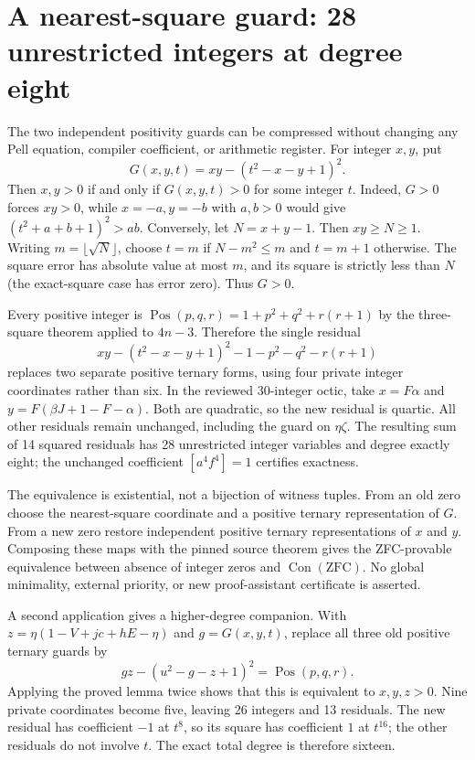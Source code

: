 \section{A nearest-square guard: 28 unrestricted integers at degree eight}
The two independent positivity guards can be compressed without changing any
Pell equation, compiler coefficient, or arithmetic register.
For integer $x,y$, put
\[
 G(x,y,t)=xy-(t^2-x-y+1)^2.
\]
Then $x,y>0$ if and only if $G(x,y,t)>0$ for some integer $t$.
Indeed, $G>0$ forces $xy>0$, while $x=-a,y=-b$ with $a,b>0$
would give $(t^2+a+b+1)^2>ab$. Conversely, let $N=x+y-1$.
Then $xy\geq N\geq1$. Writing $m=\lfloor\sqrt N\rfloor$, choose
$t=m$ if $N-m^2\leq m$ and $t=m+1$ otherwise. The square error
has absolute value at most $m$, and its square is strictly less than $N$
(the exact-square case has error zero). Thus $G>0$.

Every positive integer is
$\operatorname{Pos}(p,q,r)=1+p^2+q^2+r(r+1)$ by the three-square theorem
applied to $4n-3$. Therefore the single residual
\[
 xy-(t^2-x-y+1)^2-1-p^2-q^2-r(r+1)
\]
replaces two separate positive ternary forms, using four private integer
coordinates rather than six. In the reviewed 30-integer octic, take
$x=F\alpha$ and $y=F(\beta J+1-F-\alpha)$.
Both are quadratic, so the new residual is quartic. All other residuals
remain unchanged, including the guard on $\eta\zeta$.
The resulting sum of 14 squared residuals has 28 unrestricted integer
variables and degree exactly eight; the unchanged coefficient
$[a^4f^4]=1$ certifies exactness.

The equivalence is existential, not a bijection of witness tuples. From
an old zero choose the nearest-square coordinate and a positive ternary
representation of $G$. From a new zero restore independent positive
ternary representations of $x$ and $y$. Composing these maps with the
pinned source theorem gives the ZFC-provable equivalence between absence
of integer zeros and $\operatorname{Con}(\mathrm{ZFC})$.
No global minimality, external priority, or new proof-assistant certificate
is asserted.

A second application gives a higher-degree companion. With
$z=\eta(1-V+jc+hE-\eta)$ and $g=G(x,y,t)$, replace all three old
positive ternary guards by
\[
 gz-(u^2-g-z+1)^2=\operatorname{Pos}(p,q,r).
\]
Applying the proved lemma twice shows that this is equivalent to
$x,y,z>0$. Nine private coordinates become five, leaving 26 integers
and 13 residuals. The new residual has coefficient $-1$ at $t^8$,
so its square has coefficient $1$ at $t^{16}$; the other residuals do
not involve $t$. The exact total degree is therefore sixteen.
